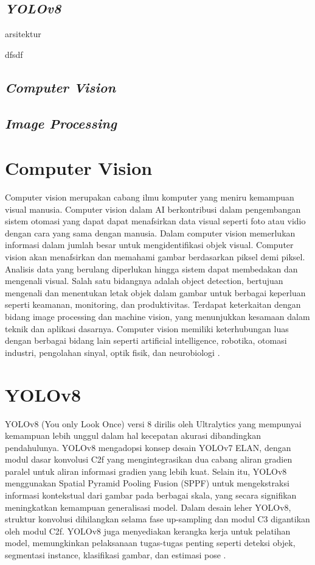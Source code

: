 \subsection{\textit{YOLOv8}}
\begin{packed_item}
	\item arsitektur 
	\item dfsdf
\end{packed_item}

\subsection{\textit{Computer Vision}}
\subsection{\textit{Image Processing}}
	

\section{Computer Vision}
Computer vision merupakan cabang ilmu komputer yang meniru kemampuan visual manusia. Computer vision dalam AI berkontribusi dalam pengembangan sistem otomasi yang dapat dapat menafsirkan data visual seperti foto atau vidio dengan cara yang sama dengan manusia. Dalam computer vision memerlukan informasi dalam jumlah besar untuk mengidentifikasi objek visual. Computer vision akan menafsirkan dan memahami gambar berdasarkan piksel demi piksel. Analisis data yang berulang diperlukan hingga sistem dapat membedakan dan mengenali visual. Salah satu bidangnya adalah object detection, bertujuan mengenali dan menentukan letak objek dalam gambar untuk berbagai keperluan seperti keamanan, monitoring, dan produktivitas.  Terdapat keterkaitan dengan bidang image processing dan machine vision, yang menunjukkan kesamaan dalam teknik dan aplikasi dasarnya. Computer vision memiliki keterhubungan luas dengan berbagai bidang lain seperti artificial intelligence, robotika, otomasi industri, pengolahan sinyal, optik fisik, dan neurobiologi \cite{anggraeni2004sistem}.

\section{YOLOv8}
YOLOv8 (You only Look Once) versi 8 dirilis oleh Ultralytics yang mempunyai kemampuan lebih unggul dalam hal kecepatan  akurasi dibandingkan pendahulunya. YOLOv8 mengadopsi konsep desain YOLOv7 ELAN, dengan modul dasar konvolusi C2f yang mengintegrasikan dua cabang aliran gradien paralel untuk aliran informasi gradien yang lebih kuat. Selain itu, YOLOv8 menggunakan Spatial Pyramid Pooling Fusion (SPPF) untuk mengekstraksi informasi kontekstual dari gambar pada berbagai skala, yang secara signifikan meningkatkan kemampuan generalisasi model. Dalam desain leher YOLOv8, struktur konvolusi dihilangkan selama fase up-sampling dan modul C3 digantikan oleh modul C2f. YOLOv8 juga menyediakan kerangka kerja untuk pelatihan model, memungkinkan pelaksanaan tugas-tugas penting seperti deteksi objek, segmentasi instance, klasifikasi gambar, dan estimasi pose \cite{bai2023automated}.


